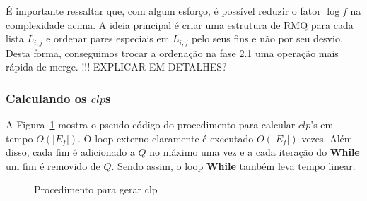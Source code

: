 \documentclass[12pt]{article}
\begin{document}
É importante ressaltar que, com algum esforço, é possível reduzir o fator 
$\log f$ na complexidade acima. A ideia principal é criar uma estrutura de RMQ
para cada lista $L_{i,j}$ e ordenar pares especiais em  $L_{i, j}$ pelo seus fins
e não por seu desvio. Desta forma, conseguimos trocar a ordenação na fase 2.1 
uma operação mais rápida de merge. !!! EXPLICAR EM DETALHES?

\subsubsection{Calculando os $clp$s}
A Figura~\ref{fig:clp} mostra o pseudo-código do procedimento
para calcular $clp$'s em tempo $O(|E_f|)$. O loop externo
claramente é executado $O(|E_f|)$ vezes. Além disso, 
cada fim é adicionado a $Q$ no máximo uma vez e a cada iteração
do {\bf While} um fim é removido de $Q$. Sendo assim,
o loop {\bf While} também leva tempo linear.


\begin{figure}


\caption{Procedimento para gerar clp}

\label{fig:clp} 

\normalsize

 \end{figure}
\end{document}
